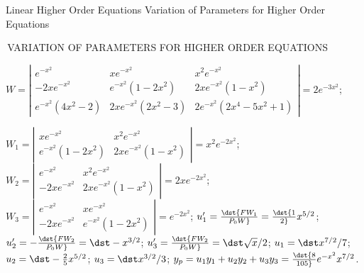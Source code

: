 \documentclass[dvips]{book}
\renewcommand{\exer}[1]{\par\medskip\;\noindent{\color{red}\bf #1.}}
\numberwithin{example}{section}
\numberwithin{equation}{section}
\numberwithin{theorem}{section}
\numberwithin{table}{section}
\numberwithin{figure}{section}
\begin{document}
 {Linear Higher Order Equations}
{Variation of Parameters for Higher Order  Equations}

\renewcommand{\thissection}{\sectiontitle
{\,VARIATION OF PARAMETERS  FOR HIGHER ORDER  EQUATIONS}}
\thissection



\vspace*{-17.5pt}


\exer{9.4.2}
$W=\left|\begin{array}{cccc}
e^{-x^2}&xe^{-x^2}&x^2e^{-x^2}\\
-2xe^{-x^2}&e^{-x^2}(1-2x^2)&2x
e^{-x^2}(1-x^2)\\
e^{-x^2}(4x^2-2)&2xe^{-x^2}(2x^2-3)&2e^{-x^2}(2x^4-5x^2+1)
\end{array}\right|=2e^{-3x^2}$;

$W_1=\left|\begin{array}{cccc}
xe^{-x^2}&x^2e^{-x^2}\\
e^{-x^2}(1-2x^2)&2xe^{-x^2}(1-x^2)
\end{array}\right|=x^2e^{-2x^2}$;
$W_2=\left|\begin{array}{cccc}
e^{-x^2}&x^2e^{-x^2}\\
-2xe^{-x^2}&2xe^{-x^2}(1-x^2)
\end{array}\right|=2xe^{-2x^2}$;
$W_3=\left|\begin{array}{cccc}
e^{-x^2}&xe^{-x^2}\\
-2xe^{-x^2}&e^{-x^2}(1-2x^2)
\end{array}\right|=e^{-2x^2}$;
$u_1'=\dst{FW_1\over P_0W}=\dst {1\over2}x^{5/2}$;
$u_2'=-\dst{FW_2\over P_0W}=\dst -x^{3/2}$;
$u_3'=\dst{FW_2\over P_0W}=\dst \sqrt{x}/2$;
$u_1=\dst x^{7/2}/7$;
$u_2=\dst -{2\over5}x^{5/2}$;
$u_3=\dst x^{3/2}/3$;
$y_p=u_1y_1+u_2y_2+u_3y_3=\dst {8\over105}e^{-x^2}x^{7/2}$.
\end{document}
